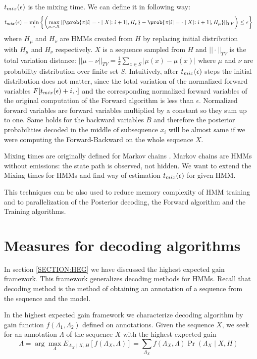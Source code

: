$t_{mix}(\epsilon)$ is the mixing time. We can define it in following way:
\[\tmix = \min_{i}\left\{ 
\left(\max_{\mu,\nu,X} || \prob{\pi[i] = \cdot\mid X[:i+1],H_\nu} - \prob{\pi[i] = \cdot\mid
X[:i+1],H_\mu}||_{TV}\right)\leq \epsilon
\right\}
\] 
where $H_\mu$ and $H_\nu$ are HMMs created from $H$ by replacing initial
distribution with $H_\mu$ and $H_\nu$ respectively.
$X$ is a sequence
sampled from $H$ and $||\cdot||_{TV}$ is the total variation distance:
$||\mu-\nu||_{TV}=\frac12\sum_{x\in S}|\mu(x)-\mu(x)|$ where $\mu$ and $\nu$
are probability distribution over finite set $S$.
Intuitively, after $t_{mix}(\epsilon)$ steps the initial distribution does not matter, since
the total variation of the normalized forward variables $F[t_{mix}(\epsilon)+i,\cdot]$
and the corresponding normalized forward variables of the original computation
of the Forward algorithm is less than $\epsilon$. Normalized forward variables
are forward variables multiplied by a constant so they sum up to one. 
Same holds for the backward
variables $B$ and therefore the posterior probabilities decoded in the middle of
subsequence $x_i$ will be almost same if we were computing the Forward-Backward
on the whole sequence $X$.

Mixing times are originally defined for Markov chains \cite{Levin2006}. Markov
chains are HMMs without emissions: the state path is observed, not hidden. We
want to extend the Mixing times for HMMs and find way of estimation $t_{mix}(\epsilon)$ for
given HMM.

This techniques can be also used to reduce memory complexity of HMM training and
to parallelization of the Posterior decoding, the Forward algorithm and the
Training algorithms.

\section{Measures for decoding algorithms}


In section \ref{SECTION:HEG} we have discussed the highest expected gain
framework. This framework generalizes decoding methods for HMMs. Recall that
decoding method is the method of obtaining an annotation of a sequence from the
sequence and the model. 

In the highest expected gain framework we characterize decoding algorithm by
gain function $f(\Lambda_1,\Lambda_2)$ defined on annotations. Given the sequence
$X$, we seek 
for an annotation $\Lambda$ of the sequence $X$ with the highest expected gain
\[\Lambda = \arg\max_{\Lambda} 
E_{\Lambda_X\mid X,H}[f(\Lambda_X,\Lambda)] =
\sum_{\Lambda_X}f(\Lambda_X,\Lambda)\Pr\left(\Lambda_X\mid X,H\right)
\]

